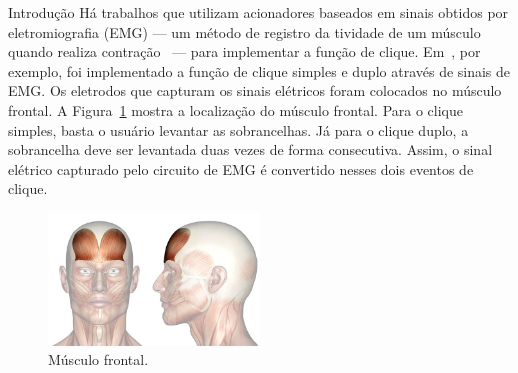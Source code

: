 \begin{chapter}{Introdução}
Há trabalhos que utilizam acionadores baseados em sinais obtidos por
eletromiografia (EMG) --- um método de registro da tividade de um músculo quando
realiza contração~\cite{Amadio07} --- para implementar a função de clique.
Em~\cite{Pinheiro12}, por exemplo, foi implementado a função de clique simples e
duplo através de sinais de EMG. Os eletrodos que capturam os sinais elétricos
foram colocados no músculo frontal. A Figura~\ref{fig:frontal} mostra a
localização do músculo frontal. Para o clique simples, basta o usuário levantar
as sobrancelhas. Já para o clique duplo, a sobrancelha deve ser levantada duas
vezes de forma consecutiva. Assim, o sinal elétrico capturado pelo circuito de
EMG é convertido nesses dois eventos de clique.

\begin{figure}[H]
	\centering
	\includegraphics[width=0.5\textwidth]{fig/frontal}
	\caption{Músculo frontal.}
	\label{fig:frontal}
\end{figure}


\end{chapter}
